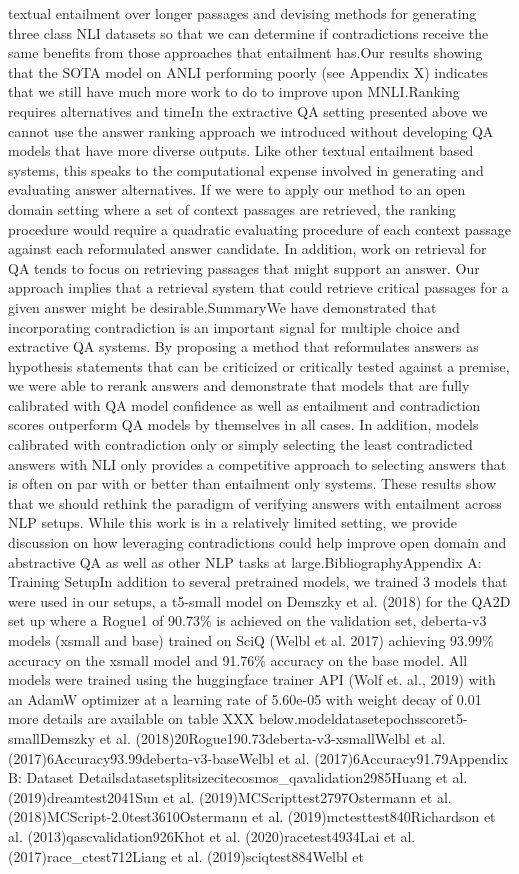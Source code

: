 \documentclass{scrbook}
\begin{document}
textual entailment over longer passages and devising methods for generating three class NLI datasets so that we can determine if contradictions receive the same benefits from those approaches that entailment has.Our results showing that the SOTA model on ANLI performing poorly (see Appendix X) indicates that we still have much more work to do to improve upon MNLI.Ranking requires alternatives and timeIn the extractive QA setting presented above we cannot use the answer ranking approach we introduced without developing QA models that have more diverse outputs.  Like other textual entailment based systems, this speaks to the computational expense involved in generating and evaluating answer alternatives. If we were to apply our method to an open domain setting where a set of context passages are retrieved, the ranking procedure would require a quadratic evaluating procedure of each context passage against each reformulated answer candidate. In addition, work on retrieval for QA tends to focus on retrieving passages that might support an answer. Our approach implies that a retrieval system that could retrieve critical passages for a given answer might be desirable.SummaryWe have demonstrated that incorporating contradiction is an important signal for multiple choice and extractive QA systems. By proposing a method that reformulates answers as hypothesis statements that can be criticized or critically tested against a premise, we were able to rerank answers and demonstrate that models that are fully calibrated with QA model confidence as well as entailment and contradiction scores outperform QA models by themselves in all cases. In addition, models calibrated with contradiction only or simply selecting the least contradicted answers with NLI only provides a competitive approach to selecting answers that is often on par with or better than entailment only systems. These results show that we should rethink the paradigm of verifying answers with entailment across NLP setups. While this work is in a relatively limited setting, we provide discussion on how leveraging contradictions could help improve open domain and abstractive QA as well as other NLP tasks at large.BibliographyAppendix A: Training SetupIn addition to several pretrained models, we trained 3 models that were used in our setups, a t5-small model on Demszky et al. (2018) for the QA2D set up where a Rogue1 of 90.73\% is achieved on the validation set, deberta-v3 models (xsmall and base) trained on SciQ (Welbl et al. 2017) achieving 93.99\% accuracy on the xsmall model and 91.76\% accuracy on the base model. All models were trained using the huggingface trainer API (Wolf et. al., 2019) with an AdamW optimizer at a learning rate of 5.60e-05 with weight decay of 0.01 more details are available on table XXX below.modeldatasetepochsscoret5-smallDemszky et al. (2018)20Rogue190.73deberta-v3-xsmallWelbl et al. (2017)6Accuracy93.99deberta-v3-baseWelbl et al. (2017)6Accuracy91.79Appendix B: Dataset Detailsdatasetsplitsizecitecosmos\_qavalidation2985Huang et al. (2019)dreamtest2041Sun et al. (2019)MCScripttest2797Ostermann et al. (2018)MCScript-2.0test3610Ostermann et al. (2019)mctesttest840Richardson et al. (2013)qascvalidation926Khot et al. (2020)racetest4934Lai et al. (2017)race\_ctest712Liang et al. (2019)sciqtest884Welbl et 
\end{document}
